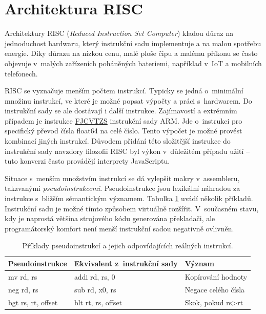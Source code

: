 
\section{Architektura RISC}

Architektury RISC (\emph{Reduced Instruction Set Computer}) kladou důraz na jednoduchost hardwaru, který instrukční sadu implementuje a na malou spotřebu energie.
Díky důrazu na nízkou cenu, malé ploše čipu a malému příkonu se často objevuje v~malých zařízeních poháněných bateriemi, například v~IoT a mobilních telefonech.

RISC se vyznačuje menším počtem instrukcí.
Typicky se jedná o~minimální množinu instrukcí, ve které je možné popsat výpočty a práci s~hardwarem.
Do instrukční sady se ale dostávají i další instrukce.
Zajímavostí a extrémním případem je instrukce \href{https://developer.arm.com/documentation/dui0801/h/A64-Floating-point-Instructions/FJCVTZS}{FJCVTZS} instrukční sady ARM.
Jde o~instrukci pro specifický převod čísla float64 na celé číslo.
Tento výpočet je možné provést kombinací jiných instrukcí.
Důvodem přidání této složitější instrukce do instrukční sady navzdory filozofii RISC byl výkon v~důležitém případu užití -- tuto konverzi často provádějí interprety JavaScriptu.


Situace s~menším množstvím instrukcí se dá vylepšit makry v~assembleru, takzvanými \emph{pseudoinstrukcemi}.
Pseudoinstrukce jsou lexikální náhradou za instrukce s~bližším sémantickým významem.
Tabulka \ref{table:pseudoins} uvádí několik příkladů.
Instrukční sadu je možné tímto způsobem virtuálně rozšířit.
V~současném stavu, kdy je naprostá většina strojového kódu generována překladači, ale programátorský komfort není menší instrukční sadou negativně ovlivněn.

\begin{table}[ht]
\centering
\begin{tabular}{|l|l|l|}
\hline
Pseudoinstrukce    & Ekvivalent z~instrukční sady & Význam                         \\ \hline\hline
mv rd, rs          & addi rd, rs, 0     & Kopírování hodnoty             \\ \hline
neg rd, rs         & sub rd, x0, rs     & Negace celého čísla            \\ \hline
bgt rs, rt, offset & blt rt, rs, offset & Skok, pokud rs\textgreater{}rt \\ \hline
\end{tabular}
\caption{Příklady pseudoinstrukcí a jejich odpovídajících reálných instrukcí.}
\label{table:pseudoins}
\end{table}

